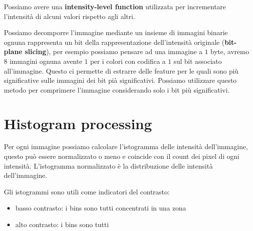 Possiamo avere una \textbf{intensity-level function} utilizzata per incrementare l'intensità
di alcuni valori rispetto agli altri.

Possiamo decomporre l'immagine mediante un insieme di immagini binarie ognuna
rappresenta un bit della rappresentazione dell'intensità originale (\textbf{bit-plane
    slicing}), per esempio possiamo pensare ad una immagine a $1$ byte, avremo
$8$ immagini ognuna avente $1$ per i colori con codifica a $1$ sul bit associato
all'immagine. Questo ci permette di estrarre delle feature per le quali sono più
significative sulle immagini dei bit pià significativi. Possiamo utilizzare
questo metodo per comprimere l'immagine considerando solo i bit più significativi.

\section{Histogram processing}
Per ogni immagine possiamo calcolare l'istogramma delle intensità dell'immagine,
questo può essere normalizzato o meno e coincide con il count dei pixel di ogni
intensità. L'istogramma normalizzato è la distribuzione delle intensità dell'immagine.

Gli istogrammi sono utili come indicatori del contrasto:
\begin{itemize}
    \item basso contrasto: i bins sono tutti concentrati in una zona
    \item alto contrasto: i bins sono tutti
\end{itemize}